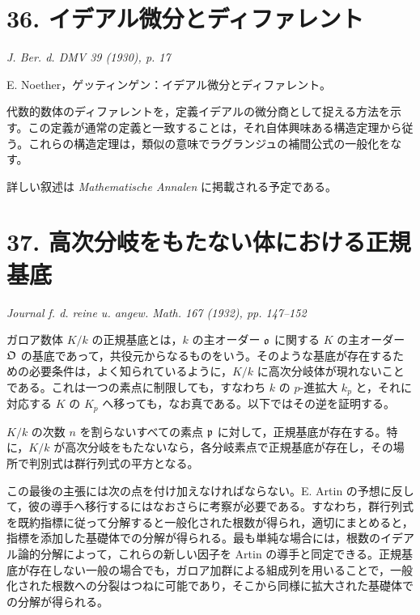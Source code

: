 \section*{36. イデアル微分とディファレント}

\begin{center}
\emph{J. Ber. d. DMV 39 (1930), p. 17}
\end{center}

E. Noether，ゲッティンゲン：イデアル微分とディファレント。

代数的数体のディファレントを，定義イデアルの微分商として捉える方法を示す。この定義が通常の定義と一致することは，それ自体興味ある構造定理から従う。これらの構造定理は，類似の意味でラグランジュの補間公式の一般化をなす。

詳しい叙述は \emph{Mathematische Annalen} に掲載される予定である。

\section*{37. 高次分岐をもたない体における正規基底}

\begin{center}
\emph{Journal f. d. reine u. angew. Math. 167 (1932), pp. 147--152}
\end{center}

ガロア数体 \(K/k\) の正規基底とは，\(k\) の主オーダー \(\mathfrak o\) に関する \(K\) の主オーダー \(\mathfrak O\) の基底であって，共役元からなるものをいう。そのような基底が存在するための必要条件は，よく知られているように，\(K/k\) に高次分岐体が現れないことである。これは一つの素点に制限しても，すなわち \(k\) の \(p\)-進拡大 \(k_p\) と，それに対応する \(K\) の \(K_p\) へ移っても，なお真である。以下ではその逆を証明する。

\(K/k\) の次数 \(n\) を割らないすべての素点 \(\mathfrak p\) に対して，正規基底が存在する。特に，\(K/k\) が高次分岐をもたないなら，各分岐素点で正規基底が存在し，その場所で判別式は群行列式の平方となる。

この最後の主張には次の点を付け加えなければならない。E. Artin の予想に反して，彼の導手へ移行するにはなおさらに考察が必要である。すなわち，群行列式を既約指標に従って分解すると一般化された根数が得られ，適切にまとめると，指標を添加した基礎体での分解が得られる。最も単純な場合には，根数のイデアル論的分解によって，これらの新しい因子を Artin の導手と同定できる。正規基底が存在しない一般の場合でも，ガロア加群による組成列を用いることで，一般化された根数への分裂はつねに可能であり，そこから同様に拡大された基礎体での分解が得られる。

